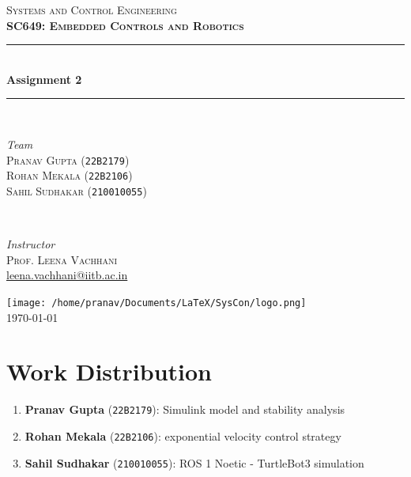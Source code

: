 \documentclass[12pt]{article}
\begin{document}
\begin{titlepage}
	\newcommand{\HRule}{\rule{\linewidth}{0.5mm}}
	\center
	
	\textsc{\Huge Systems and Control Engineering}\\[1.5cm]	
	\textsc{\LARGE\bfseries SC649: Embedded Controls and Robotics}\\[1cm] %
	
	\HRule\\[0.4cm]	
	{\huge\bfseries Assignment 2}\\[0.2cm] %
	\HRule\\[1.5cm]
	
	\begin{minipage}{0.4\textwidth}
		\begin{flushleft}
			\large
			\textit{Team}\\
			\textsc{Pranav Gupta} (\texttt{22B2179})\\
			\textsc{Rohan Mekala} (\texttt{22B2106})\\
			\textsc{Sahil Sudhakar} (\texttt{210010055})\\
		\end{flushleft}
	\end{minipage}
	~
	\begin{minipage}{0.4\textwidth}
		\begin{flushright}
			\large
			\textit{Instructor}\\
			\textsc{Prof. Leena Vachhani}\\
            \href{mailto:leena.vachhani@iitb.ac.in}{leena.vachhani@iitb.ac.in}
		\end{flushright}
	\end{minipage}
	
	\vfill\vfill\vfill
	\texttt{[image: /home/pranav/Documents/LaTeX/SysCon/logo.png]}\\[1cm]
	
	\vfill\vfill
	{\LARGE \today}
	\vfill
	
\end{titlepage}

\pagebreak
\tableofcontents

\section*{Work Distribution}
\begin{enumerate}
	\item \textbf{Pranav Gupta} (\texttt{22B2179}): Simulink model and stability analysis
	\item \textbf{Rohan Mekala} (\texttt{22B2106}): exponential velocity control strategy
	\item \textbf{Sahil Sudhakar} (\texttt{210010055}): ROS 1 Noetic - TurtleBot3 simulation
\end{enumerate}
\end{document}
